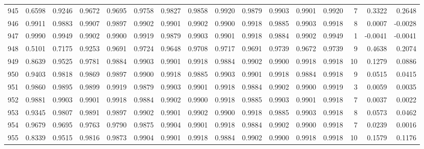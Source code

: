 \begin{tabular}{lrrrrrrrrrrrrrrr}
945 &      0.6598 &  0.9246 &  0.9672 &  0.9695 &  0.9758 &  0.9827 &  0.9858 &  0.9920 &  0.9879 &  0.9903 &   0.9901 &     0.9920 &      7 &                    0.3322 &                     0.2648 \\
946 &      0.9911 &  0.9883 &  0.9907 &  0.9897 &  0.9902 &  0.9901 &  0.9902 &  0.9900 &  0.9918 &  0.9885 &   0.9903 &     0.9918 &      8 &                    0.0007 &                    -0.0028 \\
947 &      0.9990 &  0.9949 &  0.9902 &  0.9900 &  0.9919 &  0.9879 &  0.9903 &  0.9901 &  0.9918 &  0.9884 &   0.9902 &     0.9949 &      1 &                   -0.0041 &                    -0.0041 \\
948 &      0.5101 &  0.7175 &  0.9253 &  0.9691 &  0.9724 &  0.9648 &  0.9708 &  0.9717 &  0.9691 &  0.9739 &   0.9672 &     0.9739 &      9 &                    0.4638 &                     0.2074 \\
949 &      0.8639 &  0.9525 &  0.9781 &  0.9884 &  0.9903 &  0.9901 &  0.9918 &  0.9884 &  0.9902 &  0.9900 &   0.9918 &     0.9918 &     10 &                    0.1279 &                     0.0886 \\
950 &      0.9403 &  0.9818 &  0.9869 &  0.9897 &  0.9900 &  0.9918 &  0.9885 &  0.9903 &  0.9901 &  0.9918 &   0.9884 &     0.9918 &      9 &                    0.0515 &                     0.0415 \\
951 &      0.9860 &  0.9895 &  0.9899 &  0.9919 &  0.9879 &  0.9903 &  0.9901 &  0.9918 &  0.9884 &  0.9902 &   0.9900 &     0.9919 &      3 &                    0.0059 &                     0.0035 \\
952 &      0.9881 &  0.9903 &  0.9901 &  0.9918 &  0.9884 &  0.9902 &  0.9900 &  0.9918 &  0.9885 &  0.9903 &   0.9901 &     0.9918 &      7 &                    0.0037 &                     0.0022 \\
953 &      0.9345 &  0.9807 &  0.9891 &  0.9897 &  0.9902 &  0.9901 &  0.9902 &  0.9900 &  0.9918 &  0.9885 &   0.9903 &     0.9918 &      8 &                    0.0573 &                     0.0462 \\
954 &      0.9679 &  0.9695 &  0.9763 &  0.9790 &  0.9875 &  0.9904 &  0.9901 &  0.9918 &  0.9884 &  0.9902 &   0.9900 &     0.9918 &      7 &                    0.0239 &                     0.0016 \\
955 &      0.8339 &  0.9515 &  0.9816 &  0.9873 &  0.9904 &  0.9901 &  0.9918 &  0.9884 &  0.9902 &  0.9900 &   0.9918 &     0.9918 &     10 &                    0.1579 &                     0.1176 \\

\end{tabular}
